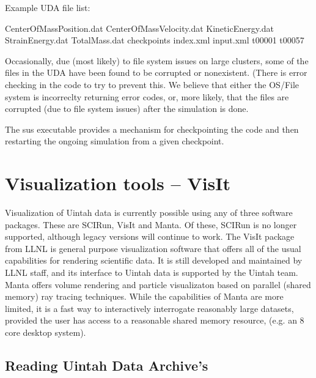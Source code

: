 Example UDA file list:

CenterOfMassPosition.dat
CenterOfMassVelocity.dat
KineticEnergy.dat
StrainEnergy.dat
TotalMass.dat
checkpoints
index.xml
input.xml
t00001
t00057


Occasionally, due (most likely) to file system issues on large
clusters, some of the files in the UDA have been found to be corrupted
or nonexistent.  (There is error checking in the code to try to
prevent this.  We believe that either the OS/File system is
incorreclty returning error codes, or, more likely, that the files are
corrupted (due to file system issues) after the simulation is done.


The sus executable provides a mechanism for checkpointing the code and
then restarting the ongoing simulation from a given checkpoint.



\chapter{Visualization tools -- VisIt}

Visualization of Uintah data is currently possible using any of three
software packages.  These are SCIRun, VisIt and Manta.  Of these, SCIRun is
no longer supported, although legacy versions will continue to work.  The
VisIt package from LLNL is general purpose visualization software that offers
all of the usual capabilities for rendering scientific data.  It is still
developed and maintained by LLNL staff, and its interface to Uintah data is
supported by the Uintah team.  Manta offers volume rendering and particle
visualizaton based on parallel (shared memory) ray tracing techniques.
While the capabilities of Manta are more limited, it is a fast way to
interactively interrogate reasonably large datasets, provided the user has
access to a reasonable shared memory resource, (e.g. an 8 core desktop system).


\section{Reading Uintah Data Archive's}


